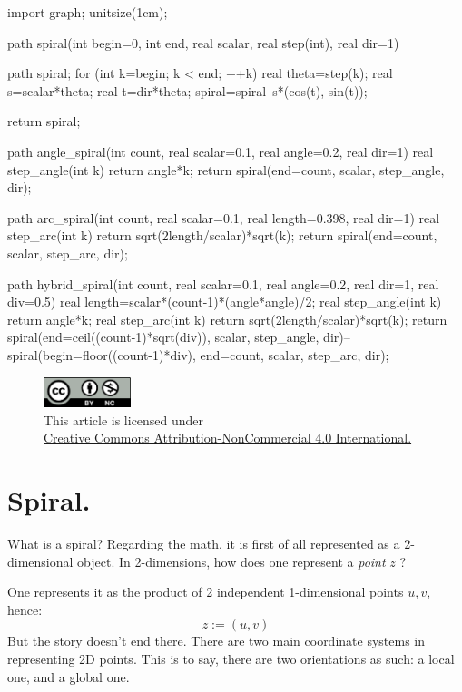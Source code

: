 \documentclass[twoside]{article}
\begin{document}
\begin{asydef}
import graph;
unitsize(1cm);

path spiral(int begin=0, int end, real scalar, real step(int), real dir=1)
{
	path spiral;
	for (int k=begin; k < end; ++k)
	{
		real theta=step(k);
		real s=scalar*theta;
		real t=dir*theta;
		spiral=spiral--s*(cos(t), sin(t));
	}

	return spiral;
}

path angle_spiral(int count, real scalar=0.1, real angle=0.2, real dir=1)
{
	real step_angle(int k) {return angle*k;}
	return spiral(end=count, scalar, step_angle, dir);
}

path arc_spiral(int count, real scalar=0.1, real length=0.398, real dir=1)
{
	real step_arc(int k) {return sqrt(2length/scalar)*sqrt(k);}
	return spiral(end=count, scalar, step_arc, dir);
}

path hybrid_spiral(int count, real scalar=0.1, real angle=0.2, real dir=1, real div=0.5)
{
	real length=scalar*(count-1)*(angle*angle)/2;
	real step_angle(int k) {return angle*k;}
	real step_arc(int k) {return sqrt(2length/scalar)*sqrt(k);}
	return spiral(end=ceil((count-1)*sqrt(div)), scalar, step_angle, dir)--
		spiral(begin=floor((count-1)*div), end=count, scalar, step_arc, dir);
}

\end{asydef}

\begin{figure}[h]
\centering
\includegraphics[width=1in]{cc-by-nc.png}\\[0.1in]
\tiny This article is licensed under \\
\href{http://creativecommons.org/licenses/by-nc/4.0/}
{Creative Commons Attribution-NonCommercial 4.0 International.}\\[0.3in]
\end{figure}

\section*{Spiral.}

What is a spiral? Regarding the math, it is first of all represented as a 2-dimensional object. In 2-dimensions,
how does one represent a \emph{point} $ z $ ?

One represents it as the product of 2 independent 1-dimensional points $ u, v $, hence:
$$ z:=(u,v) $$
But the story doesn't end there. There are two main coordinate systems in representing 2D points. This is to say,
there are two orientations as such: a local one, and a global one.
\end{document}
